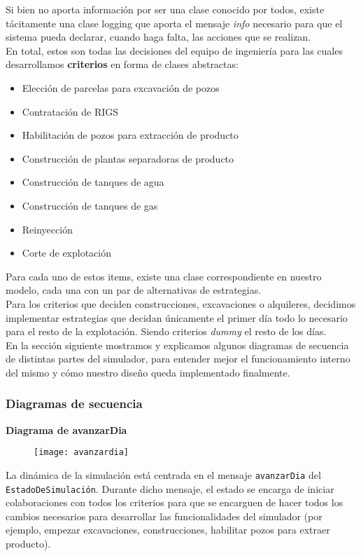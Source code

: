 Si bien no aporta información por ser una clase conocido por todos, existe tácitamente una clase logging que aporta el mensaje \emph{info} necesario para que el sistema pueda declarar, cuando haga falta, las acciones que se realizan. 
\\

En total, estos son todas las decisiones del equipo de ingeniería para las cuales 
desarrollamos \textbf{criterios} en forma de clases abstractas: 
\begin{itemize}
\item Elección de parcelas para excavación de pozos
\item Contratación de RIGS
\item Habilitación de pozos para extracción de producto
\item Construcción de plantas separadoras de producto
\item Construcción de tanques de agua
\item Construcción de tanques de gas
\item Reinyección 
\item Corte de explotación
\end{itemize}

Para cada uno de estos items, existe una clase correspondiente en nuestro modelo, 
cada una con un par de alternativas de estrategias. \\

Para los criterios que deciden construcciones, excavaciones o alquileres, decidimos implementar estrategias que decidan únicamente el primer día todo lo necesario para el resto de la explotación. Siendo criterios \emph{dummy} el resto de los días. \\

En la sección siguiente mostramos y explicamos algunos diagramas de secuencia 
de distintas partes del simulador, para entender mejor el funcionamiento interno 
del mismo y cómo nuestro diseño queda implementado finalmente. 


\newpage
\subsubsection{Diagramas de secuencia}
\textbf{Diagrama de avanzarDia}
\begin{figure}[H]
\centering
\texttt{[image: avanzardia]}
\end{figure}
La dinámica de la simulación está centrada en el mensaje \texttt{avanzarDia} del \texttt{EstadoDeSimulación}. Durante dicho mensaje, el estado se encarga de iniciar colaboraciones con todos los criterios para que se encarguen de hacer todos los cambios necesarios para desarrollar las funcionalidades del simulador (por ejemplo, 
empezar excavaciones, construcciones, habilitar pozos para extraer producto). 
\\

